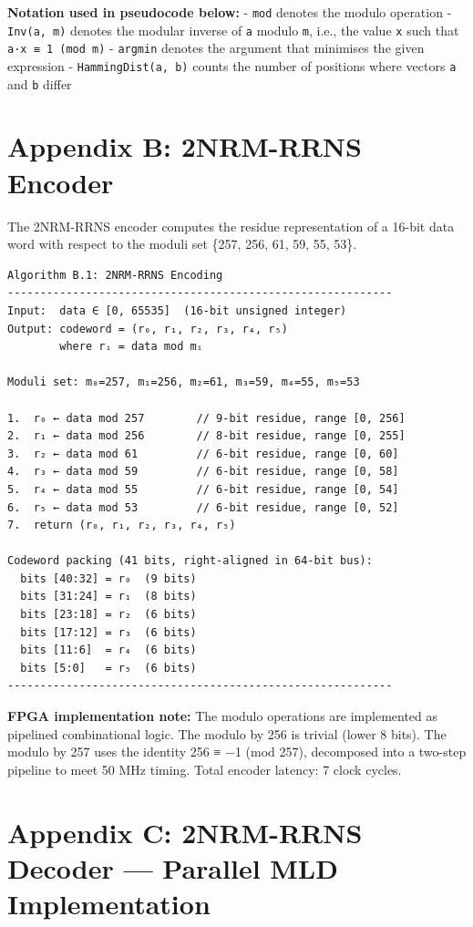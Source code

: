 \documentclass[
  12pt,
  a4paper]{report}
\begin{document}
\textbf{Notation used in pseudocode below:} - \texttt{mod} denotes the
modulo operation - \texttt{Inv(a,\ m)} denotes the modular inverse of
\texttt{a} modulo \texttt{m}, i.e., the value \texttt{x} such that
\texttt{a·x\ ≡\ 1\ (mod\ m)} - \texttt{argmin} denotes the argument that
minimises the given expression - \texttt{HammingDist(a,\ b)} counts the
number of positions where vectors \texttt{a} and \texttt{b} differ

\section{Appendix B: 2NRM-RRNS
Encoder}\label{appendix-b-2nrm-rrns-encoder}

The 2NRM-RRNS encoder computes the residue representation of a 16-bit
data word with respect to the moduli set \{257, 256, 61, 59, 55, 53\}.

\begin{verbatim}
Algorithm B.1: 2NRM-RRNS Encoding
-----------------------------------------------------------
Input:  data ∈ [0, 65535]  (16-bit unsigned integer)
Output: codeword = (r₀, r₁, r₂, r₃, r₄, r₅)
        where rᵢ = data mod mᵢ

Moduli set: m₀=257, m₁=256, m₂=61, m₃=59, m₄=55, m₅=53

1.  r₀ ← data mod 257        // 9-bit residue, range [0, 256]
2.  r₁ ← data mod 256        // 8-bit residue, range [0, 255]
3.  r₂ ← data mod 61         // 6-bit residue, range [0, 60]
4.  r₃ ← data mod 59         // 6-bit residue, range [0, 58]
5.  r₄ ← data mod 55         // 6-bit residue, range [0, 54]
6.  r₅ ← data mod 53         // 6-bit residue, range [0, 52]
7.  return (r₀, r₁, r₂, r₃, r₄, r₅)

Codeword packing (41 bits, right-aligned in 64-bit bus):
  bits [40:32] = r₀  (9 bits)
  bits [31:24] = r₁  (8 bits)
  bits [23:18] = r₂  (6 bits)
  bits [17:12] = r₃  (6 bits)
  bits [11:6]  = r₄  (6 bits)
  bits [5:0]   = r₅  (6 bits)
-----------------------------------------------------------
\end{verbatim}

\textbf{FPGA implementation note:} The modulo operations are implemented
as pipelined combinational logic. The modulo by 256 is trivial (lower 8
bits). The modulo by 257 uses the identity 256 ≡ −1 (mod 257),
decomposed into a two-step pipeline to meet 50 MHz timing. Total encoder
latency: 7 clock cycles.

\section{Appendix C: 2NRM-RRNS Decoder --- Parallel MLD
Implementation}\label{appendix-c-2nrm-rrns-decoder-parallel-mld-implementation}
\end{document}
